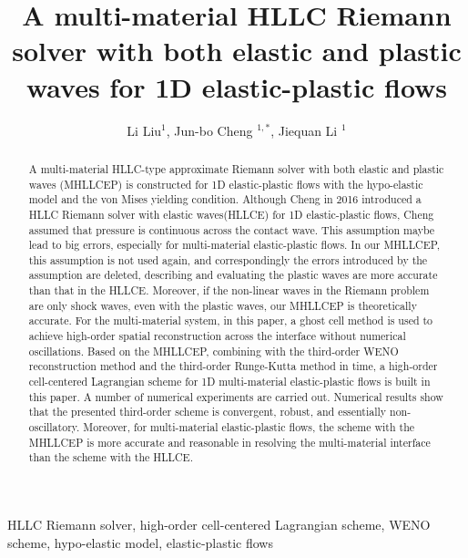 \documentclass[preprint,12pt,authoryear]{elsarticle}
\begin{document}
\begin{frontmatter}

\title{A multi-material HLLC Riemann solver with both elastic and plastic waves for 1D  elastic-plastic flows}

\author{Li Liu$^1$, Jun-bo Cheng $^{1,*}$, Jiequan Li $^{1}$}


\address{$^1$  Institute of Applied Physics and Computational Mathematics, Beijing 100094, China }

\begin{abstract}
  A multi-material HLLC-type  approximate Riemann solver with both elastic and plastic waves (MHLLCEP) is constructed for 1D elastic-plastic flows with the  hypo-elastic model and the von Mises yielding condition. Although Cheng in 2016 \cite{hllce} introduced a HLLC Riemann solver with elastic waves(HLLCE) for 1D elastic-plastic flows, Cheng assumed that pressure is continuous across the contact wave. This assumption maybe lead to big errors, especially for multi-material elastic-plastic flows. In our MHLLCEP, this assumption is not used again, and correspondingly the errors introduced by the assumption are deleted, describing and evaluating the plastic waves are more accurate than that in the HLLCE. Moreover, if the non-linear waves in the Riemann problem are only shock waves, even with the plastic waves, our MHLLCEP is theoretically accurate. For  the multi-material system, in this paper, a ghost cell method is used to achieve high-order spatial reconstruction across the interface without numerical oscillations. Based on the MHLLCEP, combining with the third-order WENO reconstruction method and the third-order Runge-Kutta method in time, a high-order cell-centered Lagrangian scheme for 1D multi-material elastic-plastic flows is built in this paper. A number of numerical experiments are carried out. Numerical results show  that the presented third-order scheme is convergent, robust, and essentially non-oscillatory. Moreover, for multi-material elastic-plastic flows, the scheme with  the MHLLCEP is more accurate and reasonable in resolving the multi-material interface than the scheme with the  HLLCE.
\end{abstract}

\begin{keyword}
  HLLC Riemann solver, high-order cell-centered Lagrangian scheme,  WENO scheme,  hypo-elastic model, elastic-plastic flows
\end{keyword}

\end{frontmatter}
\end{document}
